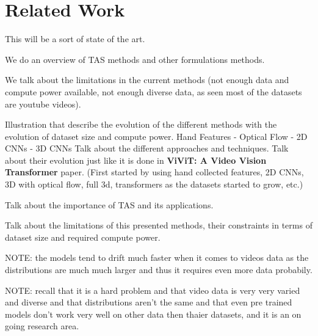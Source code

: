 \section{Related Work}

This will be a sort of state of the art.

We do an overview of TAS methods and other formulations methods.

We talk about the limitations in the current methods (not enough data and compute power available, not enough diverse data, as seen most of the datasets are youtube videos).

Illustration that describe the evolution of the different methods with the evolution of dataset size and compute power.
Hand Features - Optical Flow - 2D CNNs - 3D CNNs
Talk about the different approaches and techniques. Talk about their evolution just like it is done in \textbf{ViViT: A Video Vision Transformer} paper. (First started by using hand collected features, 2D CNNs, 3D with optical flow, full 3d, transformers as the datasets started to grow, etc.)




Talk about the importance of TAS and its applications.

Talk about the limitations of this presented methods, their constraints in terms of dataset size and required compute power.

NOTE: the models tend to drift much faster when it comes to videos data as the distributions are much much larger and thus it requires even more data  probabily.

NOTE: recall that it is a hard problem and that video data is very very varied and diverse and that distributions aren't the same and that even pre trained models don't work very well on other data then thaier datasets, and it is an on going research area.